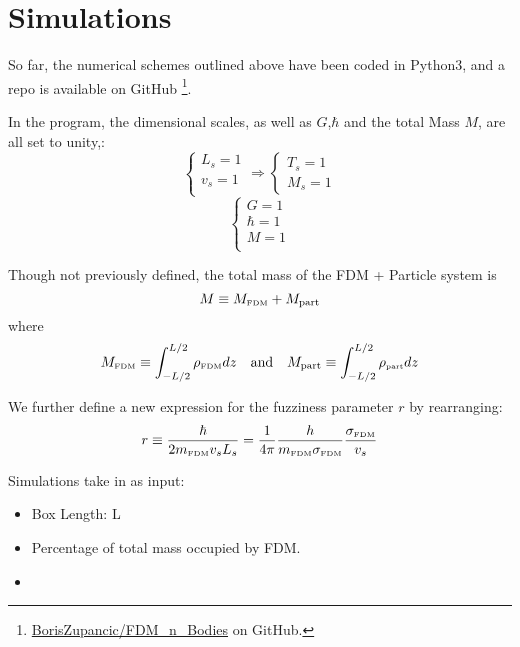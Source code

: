 \documentclass{book}
\begin{document}
\chapter{Simulations}
So far, the numerical schemes outlined above have been coded in Python3, and a repo is available on GitHub \footnote{\hyperlink{https://github.com/BorisZupancic/FDM_n_Bodies}{BorisZupancic/FDM\_n\_Bodies} on GitHub.}.

In the program, the dimensional scales, as well as $G$,$\hbar$ and the total Mass $M$, are all set to unity,:
\begin{equation*}
    \begin{cases} L_s = 1\\ v_s = 1\\ \end{cases}\Rightarrow \begin{cases}T_s = 1\\ M_s = 1\end{cases} 
\end{equation*}
\begin{equation*}
    \begin{cases}
        G = 1\\
        \hbar = 1\\
        M = 1\\
    \end{cases}
\end{equation*}
    
Though not previously defined, the total mass of the FDM + Particle system is 
\begin{equation}
    M \equiv M_\text{\tiny{FDM}} + M_\text{part} \\
\end{equation}
where
\begin{align}
    M_\text{\tiny{FDM}} \equiv \int_{-L/2}^{L/2} \rho_\text{\tiny{FDM}} dz & &\text{and}& &
    M_\text{part} \equiv \int_{-L/2}^{L/2} \rho_\text{\tiny{part}} dz
\end{align}

We further define a new expression for the fuzziness parameter $r$ by rearranging:
\begin{equation}
    r \equiv \frac{\hbar}{2m_\text{\tiny{FDM}} v_s L_s} = \frac{1}{4\pi}\frac{h}{m_\text{\tiny{FDM}}\sigma_\text{\tiny{FDM}}} \frac{\sigma_\text{\tiny{FDM}}}{v_s}
\end{equation}

Simulations take in as input:
\begin{itemize}
    \item Box Length: L
    \item Percentage of total mass occupied by FDM.
    \item     
\end{itemize}
\end{document}
